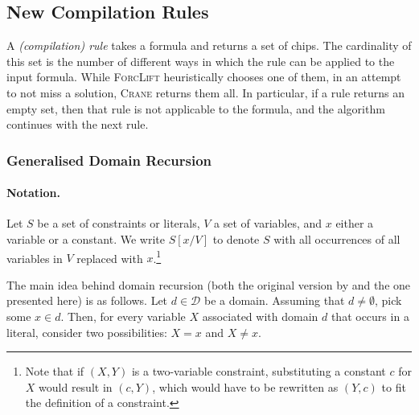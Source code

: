 \subsection{New Compilation Rules}\label{sec:rules}

A \emph{(compilation) rule} takes a formula and returns a set of chips. The
cardinality of this set is the number of different ways in which the rule can be
applied to the input formula. While \textsc{ForcLift}
\citep{DBLP:conf/ijcai/BroeckTMDR11} heuristically chooses one of them, in an
attempt to not miss a solution, \textsc{Crane} returns them all. In particular,
if a rule returns an empty set, then that rule is not applicable to the formula,
and the algorithm continues with the next rule.

\subsubsection{Generalised Domain Recursion}\label{sec:dr}

\paragraph*{Notation.}
Let $S$ be a set of constraints or literals, $V$ a set of variables, and $x$
either a variable or a constant. We write $S[x/V]$ to denote $S$ with all
occurrences of all variables in $V$ replaced with $x$.\footnote{Note that if
  $(X, Y)$ is a two-variable constraint, substituting a constant $c$ for $X$
  would result in $(c, Y)$, which would have to be rewritten as $(Y, c)$ to fit
  the definition of a constraint.}

The main idea behind domain recursion (both the original version by
\citet{DBLP:conf/nips/Broeck11} and the one presented here) is as follows. Let
$d \in \mathcal{D}$ be a domain. Assuming that $d \ne \emptyset$, pick some
$x \in d$. Then, for every variable $X$ associated with domain $d$ that occurs
in a literal, consider two possibilities: $X = x$ and $X \ne x$.

